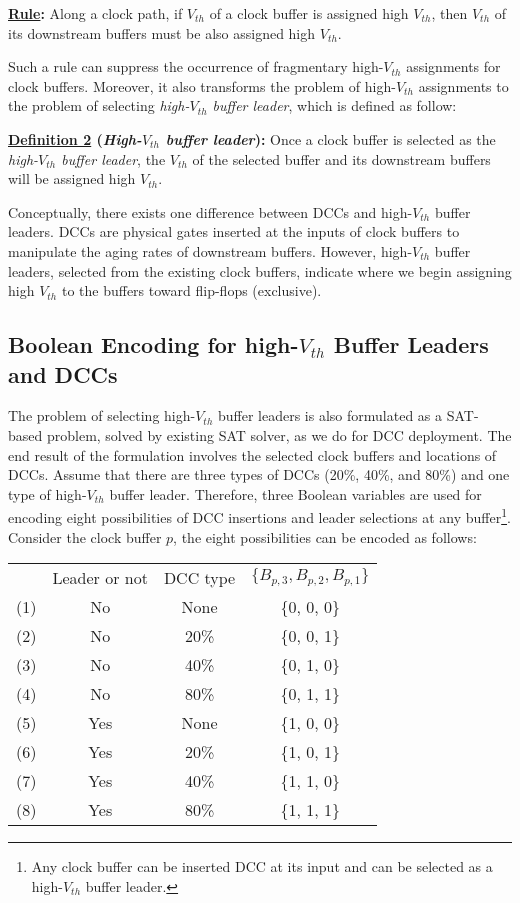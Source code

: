 \noindent \textbf{\uline{Rule}:} Along a clock path, if $V_{th}$ of a clock buffer is assigned high $V_{th}$, then $V_{th}$ of its downstream buffers must be also assigned high $V_{th}$.

Such a rule can suppress the occurrence of fragmentary high-$V_{th}$ assignments for clock buffers. Moreover, it also transforms the problem of high-$V_{th}$ assignments to the problem of selecting \textit{high-$V_{th}$ buffer leader}, which is defined as follow:

\noindent \textbf{\uline{Definition 2} (\textit{High-$V_{th}$ buffer leader}):} Once a clock buffer is selected as the \textit{high-$V_{th}$ buffer leader}, the $V_{th}$ of the selected buffer and its downstream buffers will be assigned high $V_{th}$.

Conceptually, there exists one difference between DCCs and high-$V_{th}$ buffer leaders. DCCs are physical gates inserted at the inputs of clock buffers to manipulate the aging rates of downstream buffers. However, high-$V_{th}$ buffer leaders, selected from the existing clock buffers, indicate where we begin assigning high $V_{th}$ to the buffers toward flip-flops (exclusive).

\subsection{Boolean Encoding for high-$V_{th}$ Buffer Leaders and DCCs}
The problem of selecting high-$V_{th}$ buffer leaders is also formulated as a SAT-based problem, solved by existing SAT solver, as we do for DCC deployment. The end result of the formulation involves the selected clock buffers and locations of DCCs. Assume that there are three types of DCCs (20\%, 40\%, and 80\%) and one type of high-$V_{th}$ buffer leader. Therefore, three Boolean variables are used for encoding eight possibilities of DCC insertions and leader selections at any buffer\footnote[5]{Any clock buffer can be inserted DCC at its input and can be selected as a high-$V_{th}$ buffer leader.}. Consider the clock buffer $p$, the eight possibilities can be encoded as follows:

{\small
\begin{tabular}{  c  c  c  c  }
  	 & Leader or not & DCC type & $\{B_{p,3}, B_{p,2}, B_{p,1}\}$ \\ 
  	(1)\quad & No & None & \{0, 0, 0\} \\ 
  	(2)\quad & No &20\% &  \{0, 0, 1\} \\ 
  	(3)\quad & No &40\% &  \{0, 1, 0\} \\ 
  	(4)\quad & No &80\% &  \{0, 1, 1\} \\ 
	(5)\quad & Yes & None & \{1, 0, 0\} \\ 
  	(6)\quad & Yes & 20\% &  \{1, 0, 1\} \\ 
  	(7)\quad & Yes & 40\% &  \{1, 1, 0\} \\ 
  	(8)\quad & Yes & 80\% &  \{1, 1, 1\} \\ 
\end{tabular}}

